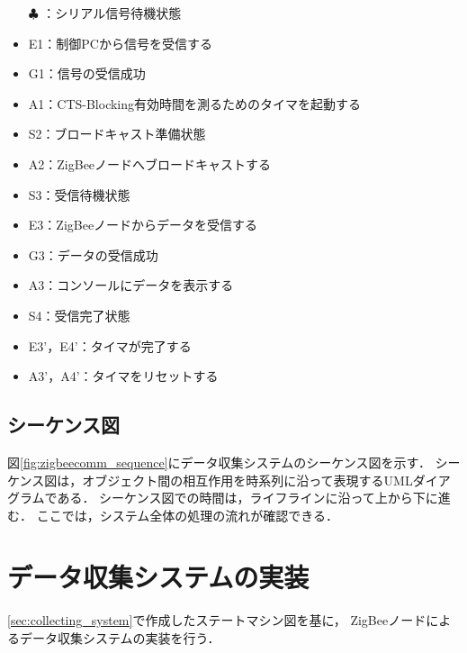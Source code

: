 \documentclass[12pt]{jreport}
\begin{document}



\begin{itemize}
 \item[$\clubsuit$]：シリアル信号待機状態
 \item E1：制御PCから信号を受信する
 \item G1：信号の受信成功
 \item A1：CTS-Blocking有効時間を測るためのタイマを起動する
 \item S2：ブロードキャスト準備状態
 \item A2：ZigBeeノードへブロードキャストする
 \item S3：受信待機状態
 \item E3：ZigBeeノードからデータを受信する
 \item G3：データの受信成功
 \item A3：コンソールにデータを表示する
 \item S4：受信完了状態
 \item E3'，E4'：タイマが完了する
 \item A3'，A4'：タイマをリセットする
\end{itemize}

\subsection{シーケンス図}

図\ref{fig:zigbeecomm_sequence}にデータ収集システムのシーケンス図を示す．
シーケンス図は，オブジェクト間の相互作用を時系列に沿って表現するUMLダイアグラムである．
シーケンス図での時間は，ライフラインに沿って上から下に進む．
ここでは，システム全体の処理の流れが確認できる．

\section{データ収集システムの実装}

\ref{sec:collecting_system}で作成したステートマシン図を基に，
ZigBeeノードによるデータ収集システムの実装を行う．


\end{document}
